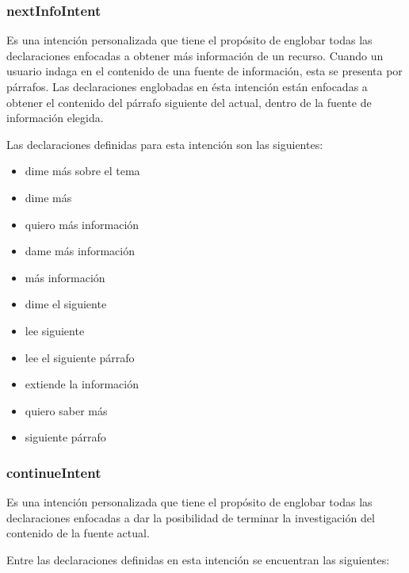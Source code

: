 
\subsubsection{nextInfoIntent}
\label{nextInfoIntentcapIV}

Es una intención personalizada que tiene el propósito de englobar todas las declaraciones enfocadas a obtener más información de un recurso. Cuando un usuario indaga en el contenido de una fuente de información, esta se presenta por párrafos. Las declaraciones englobadas en ésta intención están enfocadas a obtener el contenido del párrafo siguiente del actual, dentro de la fuente de información elegida.

Las declaraciones definidas para esta intención son las siguientes:

\begin{itemize}
  \item dime más sobre el tema
  \item dime más
  \item quiero más información
  \item dame más información
  \item más información
  \item dime el siguiente
  \item lee siguiente
  \item lee el siguiente párrafo
  \item extiende la información
  \item quiero saber más
  \item siguiente párrafo
\end{itemize}


\subsubsection{continueIntent}
\label{continueIntentcapIV}

Es una intención personalizada que tiene el propósito de englobar todas las declaraciones enfocadas a dar la posibilidad de terminar la investigación del contenido de la fuente actual.

Entre las declaraciones definidas en esta intención se encuentran las siguientes:


